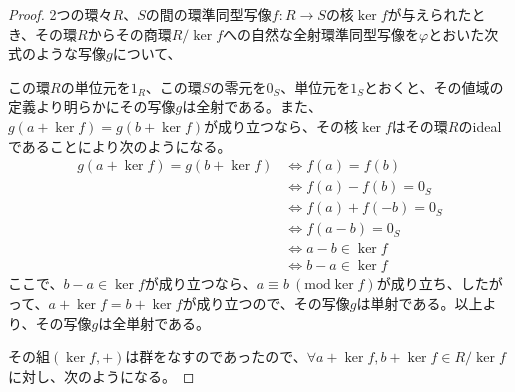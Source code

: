 \documentclass[dvipdfmx]{jsarticle}
\begin{document}
\begin{proof}
2つの環々$R$、$S$の間の環準同型写像$f:R \rightarrow S$の核$\ker f$が与えられたとき、その環$R$からその商環${R}/{\ker f}$への自然な全射環準同型写像を$\varphi$とおいた次式のような写像$g$について、
\begin{center}
\end{center}
この環$R$の単位元を$1_{R}$、この環$S$の零元を$0_{S}$、単位元を$1_{S}$とおくと、その値域の定義より明らかにその写像$g$は全射である。また、$g\left( a + \ker f \right) = g\left( b + \ker f \right)$が成り立つなら、その核$\ker f$はその環$R$のidealであることにより次のようになる。
\begin{align*}
g\left( a + \ker f \right) = g\left( b + \ker f \right) &\Leftrightarrow f(a) = f(b)\\
&\Leftrightarrow f(a) - f(b) = 0_{S}\\
&\Leftrightarrow f(a) + f( - b) = 0_{S}\\
&\Leftrightarrow f(a - b) = 0_{S}\\
&\Leftrightarrow a - b \in \ker f\\
&\Leftrightarrow b - a \in \ker f
\end{align*}
ここで、$b - a \in \ker f$が成り立つなら、$a \equiv b\ \left( \mathrm{mod}{\ker f} \right)$が成り立ち、したがって、$a + \ker f = b + \ker f$が成り立つので、その写像$g$は単射である。以上より、その写像$g$は全単射である。\par
その組$\left( \ker f, + \right)$は群をなすのであったので、$\forall a + \ker f,b + \ker f \in {R}/{\ker f}$に対し、次のようになる。

\end{proof}
\end{document}
